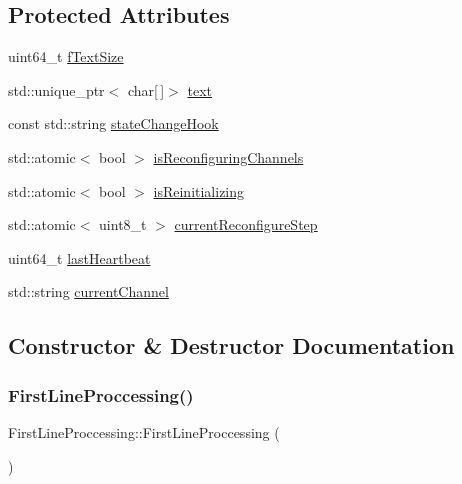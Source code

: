 \subsection*{Protected Attributes}
\begin{DoxyCompactItemize}
\item 
uint64\+\_\+t \hyperlink{classFirstLineProccessing_a6782e34694f5049048c9afcbf8a8bd7d}{f\+Text\+Size}
\item 
std\+::unique\+\_\+ptr$<$ char\mbox{[}$\,$\mbox{]}$>$ \hyperlink{classFirstLineProccessing_a78a35c2f218df874d62297b803d879a4}{text}
\item 
const std\+::string \hyperlink{classFirstLineProccessing_a908a8e7ba5887533754d271da46d22a5}{state\+Change\+Hook}
\item 
std\+::atomic$<$ bool $>$ \hyperlink{classFirstLineProccessing_ae7212631f8efe3928393177b7ed2db0b}{is\+Reconfiguring\+Channels}
\item 
std\+::atomic$<$ bool $>$ \hyperlink{classFirstLineProccessing_aea17c66168cbbb9e362e90cb8144eb9a}{is\+Reinitializing}
\item 
std\+::atomic$<$ uint8\+\_\+t $>$ \hyperlink{classFirstLineProccessing_a83388204236987508c226fc1e16ae857}{current\+Reconfigure\+Step}
\item 
uint64\+\_\+t \hyperlink{classFirstLineProccessing_a445c65978dffe57e83cbef8d529df3cf}{last\+Heartbeat}
\item 
std\+::string \hyperlink{classFirstLineProccessing_ab538ebe611859171e4ed3203be54cd67}{current\+Channel}
\end{DoxyCompactItemize}


\subsection{Constructor \& Destructor Documentation}
\mbox{\label{classFirstLineProccessing_a8361d63ddd360e64f21c6bbfa1c2ccc1}} 
\subsubsection{\texorpdfstring{First\+Line\+Proccessing()}{FirstLineProccessing()}}
{\footnotesize\ttfamily First\+Line\+Proccessing\+::\+First\+Line\+Proccessing (\begin{DoxyParamCaption}{ }\end{DoxyParamCaption})}

